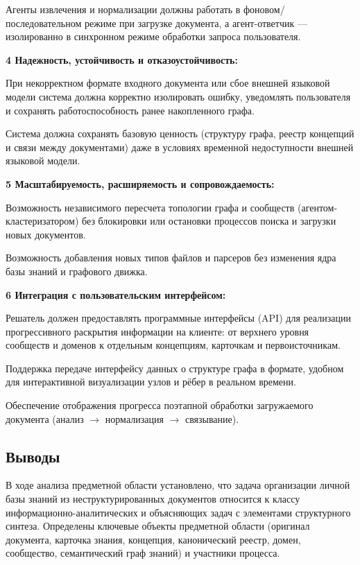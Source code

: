         Агенты извлечения и нормализации должны работать в фоновом/последовательном режиме при загрузке документа, а агент-ответчик — изолированно в синхронном режиме обработки запроса пользователя.
  

   \textbf{4 Надежность, устойчивость и отказоустойчивость:}
    
        При некорректном формате входного документа или сбое внешней языковой модели система должна корректно изолировать ошибку, уведомлять пользователя и сохранять работоспособность ранее накопленного графа.
        
        Система должна сохранять базовую ценность (структуру графа, реестр концепций и связи между документами) даже в условиях временной недоступности внешней языковой модели.


    \textbf{5 Масштабируемость, расширяемость и сопровождаемость:}
    
        Возможность независимого пересчета топологии графа и сообществ (агентом-кластеризатором) без блокировки или остановки процессов поиска и загрузки новых документов.
        
        Возможность добавления новых типов файлов и парсеров без изменения ядра базы знаний и графового движка.
    

    \textbf{6 Интеграция с пользовательским интерфейсом:}
        
        Решатель должен предоставлять программные интерфейсы (API) для реализации прогрессивного раскрытия информации на клиенте: от верхнего уровня сообществ и доменов к отдельным концепциям, карточкам и первоисточникам.
        
        Поддержка передаче интерфейсу данных о структуре графа в формате, удобном для интерактивной визуализации узлов и рёбер в реальном времени.
        
        Обеспечение отображения прогресса поэтапной обработки загружаемого документа (анализ $\rightarrow$ нормализация $\rightarrow$ связывание).

\subsection{Выводы}

В ходе анализа предметной области установлено, что задача организации личной базы знаний из неструктурированных документов относится к классу информационно-аналитических и объясняющих задач с элементами структурного синтеза. Определены ключевые объекты предметной области (оригинал документа, карточка знания, концепция, канонический реестр, домен, сообщество, семантический граф знаний) и участники процесса.

